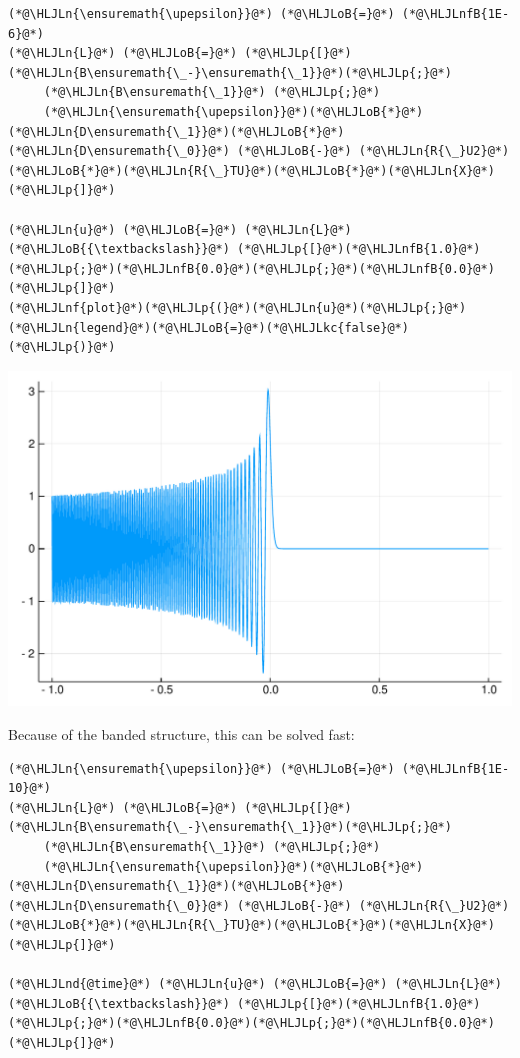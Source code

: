 \documentclass[12pt,a4paper]{article}
\newcommand{\HLJLkc}[1]{\textcolor[RGB]{59,151,46}{\textit{#1}}}
\newcommand{\HLJLn}[1]{#1}
\newcommand{\HLJLnd}[1]{\textcolor[RGB]{214,102,97}{#1}}
\newcommand{\HLJLnf}[1]{\textcolor[RGB]{66,102,213}{#1}}
\newcommand{\HLJLnfB}[1]{\textcolor[RGB]{59,151,46}{#1}}
\newcommand{\HLJLoB}[1]{\textcolor[RGB]{102,102,102}{\textbf{#1}}}
\newcommand{\HLJLp}[1]{#1}
\def\upepsilon{\varepsilon}
\begin{document}
\begin{lstlisting}
(*@\HLJLn{\ensuremath{\upepsilon}}@*) (*@\HLJLoB{=}@*) (*@\HLJLnfB{1E-6}@*)
(*@\HLJLn{L}@*) (*@\HLJLoB{=}@*) (*@\HLJLp{[}@*)(*@\HLJLn{B\ensuremath{\_-}\ensuremath{\_1}}@*)(*@\HLJLp{;}@*) 
     (*@\HLJLn{B\ensuremath{\_1}}@*) (*@\HLJLp{;}@*) 
     (*@\HLJLn{\ensuremath{\upepsilon}}@*)(*@\HLJLoB{*}@*)(*@\HLJLn{D\ensuremath{\_1}}@*)(*@\HLJLoB{*}@*)(*@\HLJLn{D\ensuremath{\_0}}@*) (*@\HLJLoB{-}@*) (*@\HLJLn{R{\_}U2}@*)(*@\HLJLoB{*}@*)(*@\HLJLn{R{\_}TU}@*)(*@\HLJLoB{*}@*)(*@\HLJLn{X}@*)(*@\HLJLp{]}@*)

(*@\HLJLn{u}@*) (*@\HLJLoB{=}@*) (*@\HLJLn{L}@*) (*@\HLJLoB{{\textbackslash}}@*) (*@\HLJLp{[}@*)(*@\HLJLnfB{1.0}@*)(*@\HLJLp{;}@*)(*@\HLJLnfB{0.0}@*)(*@\HLJLp{;}@*)(*@\HLJLnfB{0.0}@*)(*@\HLJLp{]}@*)
(*@\HLJLnf{plot}@*)(*@\HLJLp{(}@*)(*@\HLJLn{u}@*)(*@\HLJLp{;}@*) (*@\HLJLn{legend}@*)(*@\HLJLoB{=}@*)(*@\HLJLkc{false}@*)(*@\HLJLp{)}@*)
\end{lstlisting}

\includegraphics[width=\linewidth]{figures/Lecture22_17_1.pdf}

Because of the banded structure, this can be solved fast:


\begin{lstlisting}
(*@\HLJLn{\ensuremath{\upepsilon}}@*) (*@\HLJLoB{=}@*) (*@\HLJLnfB{1E-10}@*)
(*@\HLJLn{L}@*) (*@\HLJLoB{=}@*) (*@\HLJLp{[}@*)(*@\HLJLn{B\ensuremath{\_-}\ensuremath{\_1}}@*)(*@\HLJLp{;}@*) 
     (*@\HLJLn{B\ensuremath{\_1}}@*) (*@\HLJLp{;}@*) 
     (*@\HLJLn{\ensuremath{\upepsilon}}@*)(*@\HLJLoB{*}@*)(*@\HLJLn{D\ensuremath{\_1}}@*)(*@\HLJLoB{*}@*)(*@\HLJLn{D\ensuremath{\_0}}@*) (*@\HLJLoB{-}@*) (*@\HLJLn{R{\_}U2}@*)(*@\HLJLoB{*}@*)(*@\HLJLn{R{\_}TU}@*)(*@\HLJLoB{*}@*)(*@\HLJLn{X}@*)(*@\HLJLp{]}@*)

(*@\HLJLnd{@time}@*) (*@\HLJLn{u}@*) (*@\HLJLoB{=}@*) (*@\HLJLn{L}@*) (*@\HLJLoB{{\textbackslash}}@*) (*@\HLJLp{[}@*)(*@\HLJLnfB{1.0}@*)(*@\HLJLp{;}@*)(*@\HLJLnfB{0.0}@*)(*@\HLJLp{;}@*)(*@\HLJLnfB{0.0}@*)(*@\HLJLp{]}@*)
\end{lstlisting}
\end{document}
